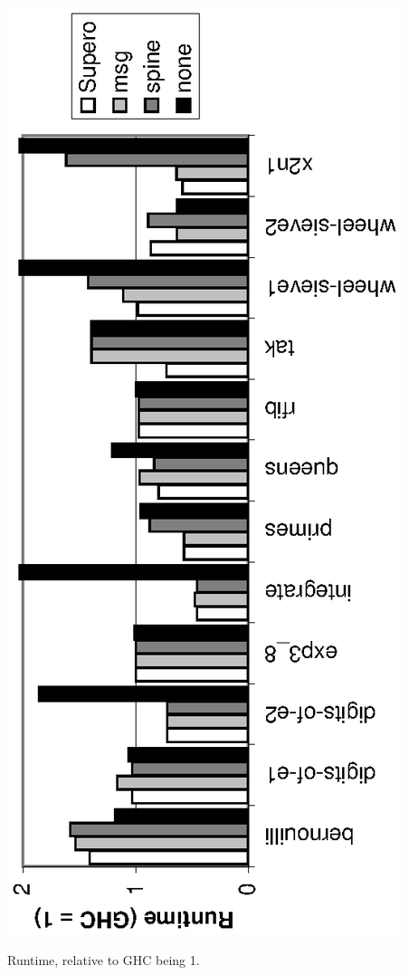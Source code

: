 \begin{fig}
\begin{center}
\includegraphics[scale=0.75,angle=270]{nofib.eps}
\end{center}
\vspace{3mm}
\figend
\caption{Runtime, relative to GHC being 1.}
\label{fig:haskell_results}
\end{fig}

